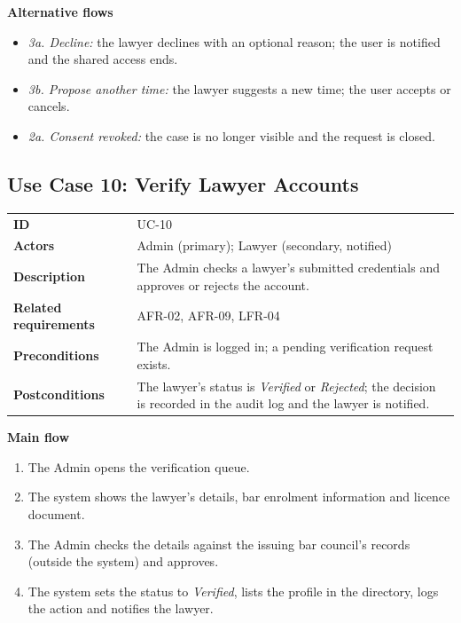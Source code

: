 \textbf{Alternative flows}

\begin{itemize}
  \item \emph{3a. Decline:} the lawyer declines with an optional reason; the user is notified and the shared access ends.
  \item \emph{3b. Propose another time:} the lawyer suggests a new time; the user accepts or cancels.
  \item \emph{2a. Consent revoked:} the case is no longer visible and the request is closed.
\end{itemize}

\subsection{Use Case 10: Verify Lawyer Accounts}

\begin{center}
\begin{tabular}{|L{3.13cm}|L{11.80cm}|}
\hline\headrow {} &  \\ \hline
\textbf{ID} & UC-10 \\ \hline
\textbf{Actors} & Admin (primary); Lawyer (secondary, notified) \\ \hline
\textbf{Description} & The Admin checks a lawyer's submitted credentials and approves or rejects the account. \\ \hline
\textbf{Related requirements} & AFR-02, AFR-09, LFR-04 \\ \hline
\textbf{Preconditions} & The Admin is logged in; a pending verification request exists. \\ \hline
\textbf{Postconditions} & The lawyer's status is \emph{Verified} or \emph{Rejected}; the decision is recorded in the audit log and the lawyer is notified. \\ \hline
\end{tabular}
\end{center}

\textbf{Main flow}

\begin{enumerate}
  \item The Admin opens the verification queue.
  \item The system shows the lawyer's details, bar enrolment information and licence document.
  \item The Admin checks the details against the issuing bar council's records (outside the system) and approves.
  \item The system sets the status to \emph{Verified}, lists the profile in the directory, logs the action and notifies the lawyer.
\end{enumerate}

